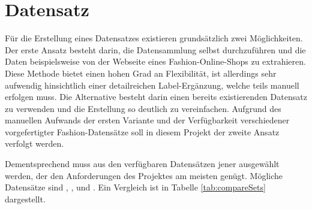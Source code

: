 \section{Datensatz} \label{sec:data_set}

Für die Erstellung eines Datensatzes existieren grundsätzlich zwei Möglichkeiten. Der erste Ansatz besteht darin, die Datensammlung selbst durchzuführen und die Daten beispielsweise von der Webseite eines Fashion-Online-Shops zu extrahieren. Diese Methode bietet einen hohen Grad an Flexibilität, ist allerdings sehr aufwendig hinsichtlich einer detailreichen Label-Ergänzung, welche teils manuell erfolgen muss. Die Alternative besteht darin einen bereits existierenden Datensatz zu verwenden und die Erstellung so deutlich zu vereinfachen. Aufgrund des manuellen Aufwands der ersten Variante und der Verfügbarkeit verschiedener vorgefertigter Fashion-Datensätze soll in diesem Projekt der zweite Ansatz verfolgt werden.

Dementsprechend muss aus den verfügbaren Datensätzen jener ausgewählt werden, der den Anforderungen des Projektes am meisten genügt. Mögliche Datensätze sind  \cite{FashionProduct2019},  \cite{Fashionpedia2020},  \cite{FashionMNIST2017} und  \cite{DeepFashion2016}. Ein Vergleich ist in Tabelle \ref{tab:compareSets} dargestellt. 

\begin{table}[H]
	\centering
	\caption{Vergleich verschiedener Fashion-Datensätze}
	\label{tab:compareSets}
\end{table}

